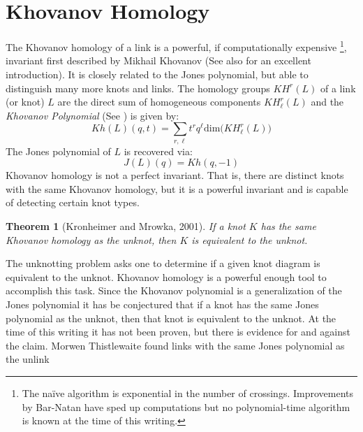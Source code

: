 \documentclass{article}
\theoremstyle{plain}
\newtheorem{theorem}{Theorem}
\begin{document}
    \section{Khovanov Homology}
        The Khovanov homology of a link is a powerful, if computationally
        expensive%
        \footnote{%
            The na\"{i}ve algorithm is exponential in the number of
            crossings. Improvements by Bar-Natan \cite{BarNatanFastKhoHo}
            have sped up computations but no polynomial-time algorithm is
            known at the time of this writing.
        },
        invariant first described by Mikhail Khovanov
        \cite{Khovanov1999CatJonesPoly} (See also \cite{barnatan2002khovanov}
        for an excellent introduction). It is closely related to the Jones
        polynomial, but able to distinguish many more knots and links. The
        homology groups $KH^{r}(L)$ of a link (or knot) $L$ are the direct sum
        of homogeneous components $KH_{\ell}^{r}(L)$ and the
        \textit{Khovanov Polynomial} (See \cite{KatlasKhoHo}) is given by:
        \begin{equation}
            Kh(L)(q,t)=
            \sum_{r,\ell}t^{r}q^{\ell}\textrm{dim}\big(KH_{\ell}^{r}(L)\big)
        \end{equation}
        The Jones polynomial of $L$ is recovered via:
        \begin{equation}
            J(L)(q)=Kh(q,-1)
        \end{equation}
        Khovanov homology is not a perfect invariant. That is, there are
        distinct knots with the same Khovanov homology, but it is a powerful
        invariant and is capable of detecting certain knot types.
        \begin{theorem}[Kronheimer and Mrowka, 2001]
            If a knot $K$ has the same Khovanov homology as the unknot, then $K$
            is equivalent to the unknot.
        \end{theorem}
        The unknotting problem asks one to determine if a given knot diagram is
        equivalent to the unknot. Khovanov homology is a powerful enough tool
        to accomplish this task. Since the Khovanov polynomial is a
        generalization of the Jones polynomial it has be conjectured that if a
        knot has the same Jones polynomial as the unknot, then that knot is
        equivalent to the unknot. At the time of this writing it has not been
        proven, but there is evidence for and against the claim. Morwen
        Thistlewaite found links with the same Jones polynomial as the unlink
\end{document}
